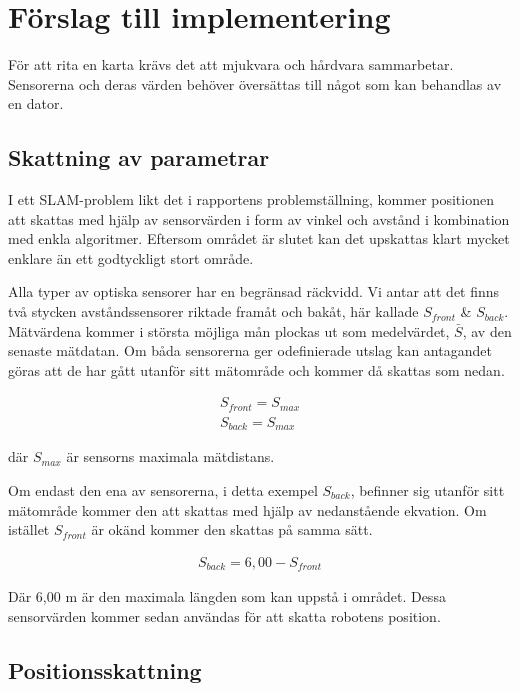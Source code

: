 \documentclass[a4paper,12pt,fleqn]{article}
\begin{document}
\section{Förslag till implementering}

För att rita en karta krävs det att mjukvara och hårdvara sammarbetar. Sensorerna och deras värden behöver översättas till något som kan behandlas av en dator. 


\subsection{Skattning av parametrar}

I ett SLAM-problem likt det i rapportens problemställning, kommer positionen att skattas med hjälp av sensorvärden i form av vinkel och avstånd i kombination med enkla algoritmer. Eftersom området är slutet kan det upskattas klart mycket enklare än ett godtyckligt stort område. 

Alla typer av optiska sensorer har en begränsad räckvidd. Vi antar att det finns två stycken avståndssensorer riktade framåt och bakåt, här kallade $S_{front}$ \& $S_{back}$. Mätvärdena kommer i största möjliga mån plockas ut som medelvärdet, $\bar{S}$, av den senaste mätdatan. Om båda sensorerna ger odefinierade utslag kan antagandet göras att de har gått utanför sitt mätområde och kommer då skattas som nedan. 

\begin{gather}
	S_{front}=S_{max}\\
	S_{back}=S_{max}
\end{gather}

där $S_{max}$ är sensorns maximala mätdistans.

Om endast den ena av sensorerna, i detta exempel $S_{back}$, befinner sig utanför sitt mätområde kommer den att skattas med hjälp av nedanstående ekvation. Om istället $S_{front}$ är okänd kommer den skattas på samma sätt. 

\begin{gather}
	S_{back}=6,00-S_{front}
\end{gather}

Där 6,00 m är den maximala längden som kan uppstå i området. Dessa sensorvärden kommer sedan användas för att skatta robotens position.



\subsection{Positionsskattning}
\end{document}

